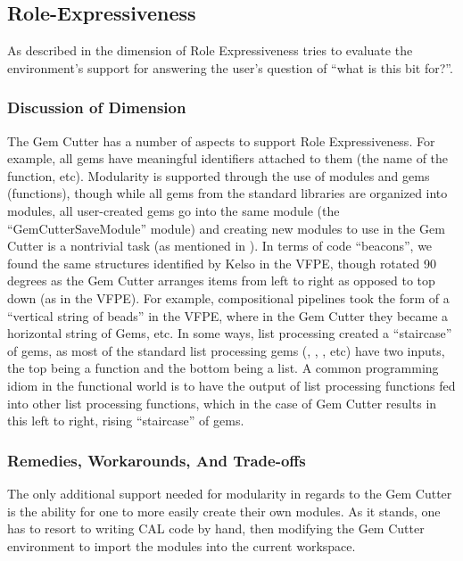\subsection{Role-Expressiveness}

As described in  the dimension of Role Expressiveness tries to evaluate the environment's support for answering the user's question of ``what is this bit for?''.

\subsubsection{Discussion of Dimension}

The Gem Cutter has a number of aspects to support Role Expressiveness.  For example, all gems have meaningful identifiers attached to them (the name of the function, etc).  Modularity is supported through the use of modules and gems (functions), though while all gems from the standard libraries are organized into modules, all user-created gems go into the same module (the ``GemCutterSaveModule'' module) and creating new modules to use in the Gem Cutter is a nontrivial task (as mentioned in ).  In terms of code ``beacons'', we found the same structures identified by Kelso in the VFPE, though rotated 90 degrees as the Gem Cutter arranges items from left to right as opposed to top down (as in the VFPE).  For example, compositional pipelines took the form of a ``vertical string of beads''\cite{Kelso02} in the VFPE, where in the Gem Cutter they became a horizontal string of Gems, etc.  In some ways, list processing created a ``staircase'' of gems, as most of the standard list processing gems (, , , etc) have two inputs, the top being a function and the bottom being a list.  A common programming idiom in the functional world is to have the output of list processing functions fed into other list processing functions, which in the case of Gem Cutter results in this left to right, rising ``staircase'' of gems.

\subsubsection{Remedies, Workarounds, And Trade-offs}

The only additional support needed for modularity in regards to the Gem Cutter is the ability for one to more easily create their own modules.  As it stands, one has to resort to writing CAL code by hand, then modifying the Gem Cutter environment to import the modules into the current workspace.

